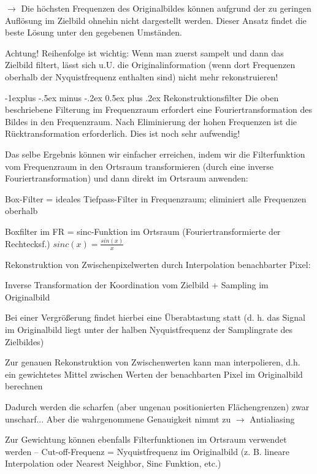 \documentclass[landscape]{article}
\makeatletter
\renewcommand{\subsection}{\@startsection{subsection}{2}{0mm}%
                                {-1explus -.5ex minus -.2ex}%
                                {0.5ex plus .2ex}%
                                {\normalfont\normalsize\bfseries}}
\makeatother
\begin{document}
\begin{multicols}{3}
  $\rightarrow$ Die höchsten Frequenzen des Originalbildes können aufgrund der zu geringen Auflösung im Zielbild ohnehin nicht dargestellt werden. Dieser Ansatz findet die beste Lösung unter den gegebenen Umständen. 
  
  Achtung! Reihenfolge ist wichtig: Wenn man zuerst sampelt und dann das Zielbild filtert, lässt sich u.U. die Originalinformation (wenn dort Frequenzen oberhalb der Nyquistfrequenz enthalten sind) nicht mehr rekonstruieren!
  
  \subsection{Rekonstruktionsfilter}
  Die oben beschriebene Filterung im Frequenzraum erfordert eine Fouriertransformation des Bildes in den Frequenzraum. Nach Eliminierung der hohen Frequenzen ist die Rücktransformation erforderlich. Dies ist noch sehr aufwendig!
  
  Das selbe Ergebnis können wir einfacher erreichen, indem wir die Filterfunktion vom Frequenzraum in den Ortsraum transformieren (durch eine inverse Fouriertransformation) und dann direkt im Ortsraum anwenden:
  \begin{itemize*}
    \item Box-Filter = ideales Tiefpass-Filter in Frequenzraum; eliminiert alle Frequenzen oberhalb
    \item Boxfilter im FR = sinc-Funktion im Ortsraum (Fouriertransformierte der Rechtecksf.) $sinc(x)=\frac{sin(x)}{x}$
  \end{itemize*}
  
  Rekonstruktion von Zwischenpixelwerten durch Interpolation benachbarter Pixel:
  \begin{itemize*}
    \item Inverse Transformation der Koordination vom Zielbild + Sampling im Originalbild
    \item Bei einer Vergrößerung findet hierbei eine Überabtastung statt (d. h. das Signal im Originalbild liegt unter der halben Nyquistfrequenz der Samplingrate des Zielbildes)
    \item Zur genauen Rekonstruktion von Zwischenwerten kann man interpolieren, d.h. ein gewichtetes Mittel zwischen Werten der benachbarten Pixel im Originalbild berechnen
    \item Dadurch werden die scharfen (aber ungenau positionierten Flächengrenzen) zwar unscharf... Aber die wahrgenommene Genauigkeit nimmt zu $\rightarrow$ Antialiasing
    \item Zur Gewichtung können ebenfalls Filterfunktionen im Ortsraum verwendet werden – Cut-off-Frequenz = Nyquistfrequenz im Originalbild (z. B. lineare Interpolation oder Nearest Neighbor, Sinc Funktion, etc.)
  \end{itemize*}
  

\end{multicols}
\end{document}
